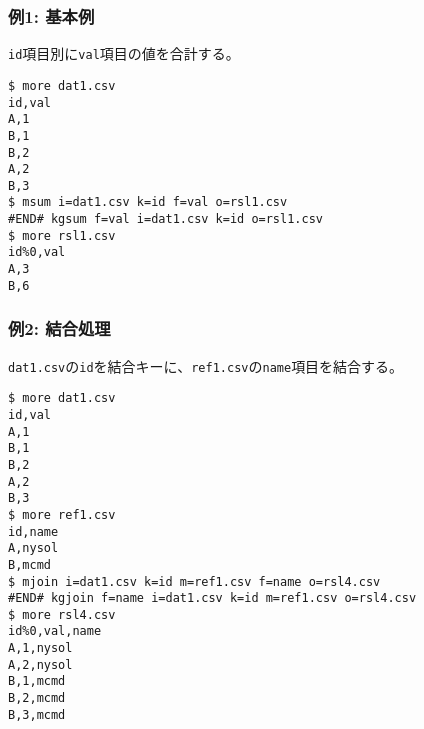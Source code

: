 \subsubsection*{例1: 基本例}

\verb|id|項目別に\verb|val|項目の値を合計する。


\begin{Verbatim}[baselinestretch=0.7,frame=single]
$ more dat1.csv
id,val
A,1
B,1
B,2
A,2
B,3
$ msum i=dat1.csv k=id f=val o=rsl1.csv
#END# kgsum f=val i=dat1.csv k=id o=rsl1.csv
$ more rsl1.csv
id%0,val
A,3
B,6
\end{Verbatim}
\subsubsection*{例2: 結合処理}

\verb|dat1.csv|の\verb|id|を結合キーに、\verb|ref1.csv|の\verb|name|項目を結合する。


\begin{Verbatim}[baselinestretch=0.7,frame=single]
$ more dat1.csv
id,val
A,1
B,1
B,2
A,2
B,3
$ more ref1.csv
id,name
A,nysol
B,mcmd
$ mjoin i=dat1.csv k=id m=ref1.csv f=name o=rsl4.csv
#END# kgjoin f=name i=dat1.csv k=id m=ref1.csv o=rsl4.csv
$ more rsl4.csv
id%0,val,name
A,1,nysol
A,2,nysol
B,1,mcmd
B,2,mcmd
B,3,mcmd
\end{Verbatim}
